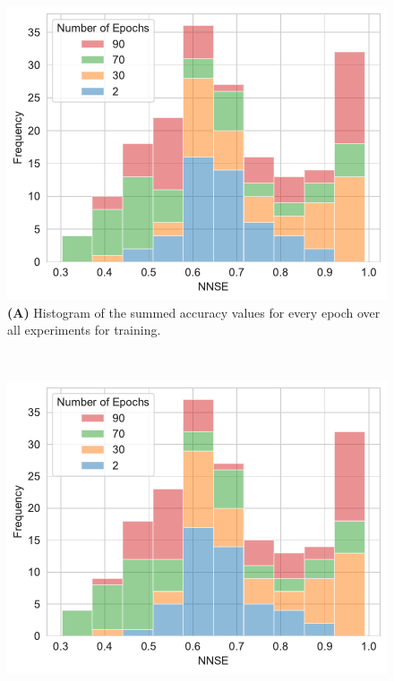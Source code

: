 \documentclass[utf8]{FrontiersinVancouver} %
\begin{document}
\begin{figure}[p]

  \begin{center}
       \begin{minipage}[t]{0.49\textwidth}
        \includegraphics[width=1.0\linewidth]{images/frequency_nnse_histogram_stacked_df_training_summed}
        {\bf (A)} Histogram of the summed accuracy values for every epoch over all experiments for training.
     \end{minipage}
  \ \
     \begin{minipage}[t]{0.49\textwidth}
        \includegraphics[width=1.0\linewidth]{images/frequency_nnse_histogram_stacked_df_validation_summed}

\end{minipage}
\end{center}
\end{figure}
\end{document}
